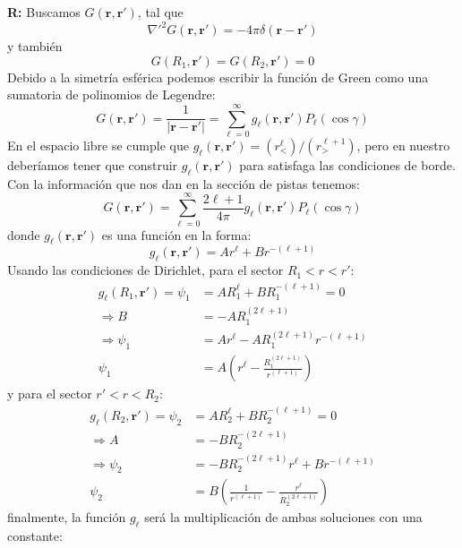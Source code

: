 \documentclass[]{article}
\numberwithin{equation}{section}
\newcommand{\0}{\textcolor{gray}{0}}
\newcommand{\rv}{\mathbf{r}}
\newcommand{\rdif}{\rv - \rv'}
\begin{document}
\begin{enumerate}
	\textbf{R:} Buscamos \(G(\rv,\rv')\), tal que
	\begin{equation*}
		\nabla'^2 G(\rv,\rv') = -4 \pi \delta(\rdif)
	\end{equation*}
	y también
	\begin{equation*}
		G(R_1,\rv') = G(R_2,\rv') = 0
	\end{equation*}
	Debido a la simetría esférica podemos escribir la función de Green como una sumatoria de polinomios de Legendre:
	\begin{equation*}
		G(\rv,\rv') = \frac{1}{|\rv - \rv'|} = \sum_{\ell=0}^{\infty} g_\ell(\rv,\rv') P_{\ell}(\cos\gamma)
	\end{equation*}
	En el espacio libre se cumple que \(g_\ell(\rv,\rv') = \left({r_{<}^{\ell}}\right)/\left({r_{>}^{\ell + 1}}\right)\), pero en nuestro deberíamos tener que construir \(g_\ell(\rv,\rv')\) para satisfaga las condiciones de borde. Con la información que nos dan en la sección de pistas tenemos:
	\begin{equation*}
		G(\rv,\rv') = \sum_{\ell=0}^{\infty} \frac{2\ell + 1}{4\pi} g_\ell(\rv,\rv') P_{\ell}(\cos\gamma)
	\end{equation*}
	donde $g_\ell(\rv, \rv')$ es una función en la forma:
	\begin{equation*}
		g_\ell(\rv, \rv') = A r^{\ell} + B r^{-(\ell + 1)}
	\end{equation*}
	Usando las condiciones de Dirichlet, para el sector \(R_1 < r < r'\):
	\begin{align*}
		g_\ell(R_1, \rv') = \psi_1 &= A R_1^{\ell} + B R_1^{-(\ell + 1)} = 0\\
		\Rightarrow B &= -A R_1^{(2\ell + 1)}\\
		\Rightarrow \psi_1 &= A r^{\ell} - A R_1^{(2\ell + 1)} r^{-(\ell + 1)}\\
		\psi_1 &= A \left(r^{\ell} -  \frac{R_1^{(2\ell + 1)}}{r^{(\ell + 1)}}\right)
	\end{align*}
	y para el sector \(r' < r < R_2\):
	\begin{align*}
		g_\ell(R_2, \rv') = \psi_2 &= A R_2^{\ell} + B R_2^{-(\ell + 1)} = 0\\
		\Rightarrow A &= -B R_2^{-(2\ell + 1)}\\
		\Rightarrow \psi_2 &= -B R_2^{-(2\ell + 1)} r^{\ell} + B r^{-(\ell + 1)}\\
		\psi_2 &= B \left(\frac{1}{r^{(\ell + 1)}} - \frac{r^{\ell}}{R_2^{(2\ell + 1)}}\right)
	\end{align*}
	finalmente, la función \(g_\ell\) será la multiplicación de ambas soluciones con una constante:

\end{enumerate}
\end{document}
